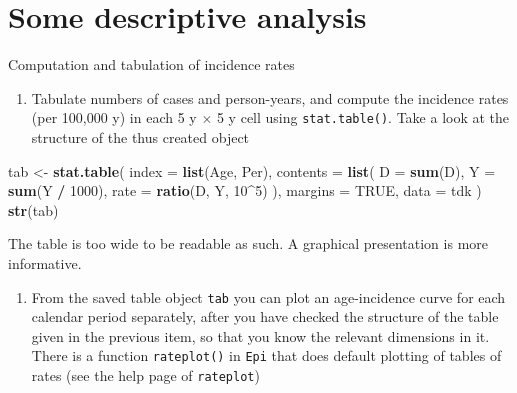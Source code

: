 \documentclass[
]{book}
\newenvironment{Shaded}{\begin{snugshade}}{\end{snugshade}}
\newcommand{\AttributeTok}[1]{\textcolor[rgb]{0.13,0.29,0.53}{#1}}
\newcommand{\ConstantTok}[1]{\textcolor[rgb]{0.56,0.35,0.01}{#1}}
\newcommand{\DecValTok}[1]{\textcolor[rgb]{0.00,0.00,0.81}{#1}}
\newcommand{\FunctionTok}[1]{\textcolor[rgb]{0.13,0.29,0.53}{\textbf{#1}}}
\newcommand{\NormalTok}[1]{#1}
\newcommand{\OtherTok}[1]{\textcolor[rgb]{0.56,0.35,0.01}{#1}}
\newcommand{\SpecialCharTok}[1]{\textcolor[rgb]{0.81,0.36,0.00}{\textbf{#1}}}
\providecommand{\tightlist}{%
  \setlength{\itemsep}{0pt}\setlength{\parskip}{0pt}}
\begin{document}
\section{Some descriptive analysis}\label{some-descriptive-analysis}

Computation and tabulation of incidence rates

\begin{enumerate}
\def\labelenumi{\arabic{enumi}.}
\tightlist
\item
  Tabulate numbers of cases and person-years, and compute the
  incidence rates (per 100,000 y) in each 5 y \(\times\) 5 y cell using
  \texttt{stat.table()}. Take a look at the structure of the thus created
  object
\end{enumerate}

\begin{Shaded}
\begin{Highlighting}[]
\NormalTok{tab }\OtherTok{\textless{}{-}} \FunctionTok{stat.table}\NormalTok{(}
  \AttributeTok{index =} \FunctionTok{list}\NormalTok{(Age, Per),}
  \AttributeTok{contents =} \FunctionTok{list}\NormalTok{(}
    \AttributeTok{D =} \FunctionTok{sum}\NormalTok{(D),}
    \AttributeTok{Y =} \FunctionTok{sum}\NormalTok{(Y }\SpecialCharTok{/} \DecValTok{1000}\NormalTok{),}
    \AttributeTok{rate =} \FunctionTok{ratio}\NormalTok{(D, Y, }\DecValTok{10}\SpecialCharTok{\^{}}\DecValTok{5}\NormalTok{)}
\NormalTok{  ),}
  \AttributeTok{margins =} \ConstantTok{TRUE}\NormalTok{,}
  \AttributeTok{data =}\NormalTok{ tdk}
\NormalTok{)}
\FunctionTok{str}\NormalTok{(tab)}
\end{Highlighting}
\end{Shaded}

The table is too wide to be readable as such. A graphical presentation
is more informative.

\begin{enumerate}
\def\labelenumi{\arabic{enumi}.}
\setcounter{enumi}{1}
\tightlist
\item
  From the saved table object \texttt{tab} you can plot an age-incidence
  curve for each calendar period separately, after you have checked
  the structure of the table given in the previous item, so that you
  know the relevant dimensions in it. There is a function \texttt{rateplot()}
  in \texttt{Epi} that does default plotting of tables of rates (see the help
  page of \texttt{rateplot})
\end{enumerate}
\end{document}
